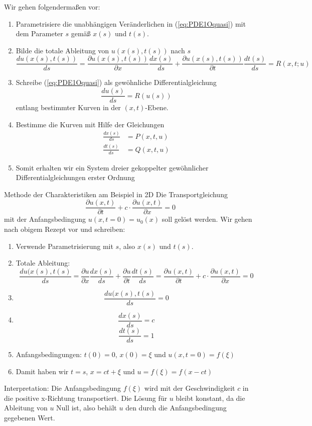 Wir gehen folgendermaßen vor:
\begin{enumerate}
    \item Parametrisiere die unabhängigen Veränderlichen in (\ref{eq:PDE1Oquasi}) mit dem Parameter $s$ gemäß $x(s)$ und $t(s)$.
    \item Bilde die totale Ableitung von $u(x(s),t(s))$ nach $s$
    \[
    \frac{du(x(s),t(s))}{ds}=
    \frac{\partial u(x(s),t(s))}{\partial x}\frac{dx(s)}{ds}+
    \frac{\partial u(x(s),t(s))}{\partial t}\frac{dt(s)}{ds}=
    R(x,t;u)
    \]
    \item Schreibe (\ref{eq:PDE1Oquasi}) als gewöhnliche Differentialgleichung
    \[\frac{du(s)}{ds}=R(u(s))\]
    entlang bestimmter Kurven in der $(x,t)$-Ebene.
    \item Bestimme die Kurven mit Hilfe der Gleichungen
    \begin{align*}
        \frac{dx(s)}{ds}&=P(x,t,u)\\
        \frac{dt(s)}{ds}&=Q(x,t,u)
    \end{align*}
    \item Somit erhalten wir ein System dreier gekoppelter gewöhnlicher Differentialgleichungen erster Ordnung
\end{enumerate}
%
\begin{example}{Methode der Charakteristiken am Beispiel in 2D}
Die Transportgleichung
\[
\frac{\partial u(x,t)}{\partial t}+c\cdot\frac{\partial u(x,t)}{\partial x}=0
\]
mit der Anfangsbedingung $u(x,t=0)=u_0(x)$ soll gelöst werden. Wir gehen nach obigem Rezept vor und schreiben:
\begin{enumerate}
    \item Verwende Parametrisierung mit $s$, also $x(s)$ und $t(s)$.
    \item Totale Ableitung:
    \[\frac{du(x(s),t(s)}{ds}=\frac{\partial u}{\partial x}\frac{dx(s)}{ds}+
    \frac{\partial u}{\partial t}\frac{dt(s)}{ds}=
    \frac{\partial u(x,t)}{\partial t}+c\cdot\frac{\partial u(x,t)}{\partial x}=0\]
    \item\[\frac{du(x(s),t(s)}{ds}=0\]
    \item \[\frac{dx(s)}{ds}=c\]
    \[\frac{dt(s)}{ds}=1\]
    \item Anfangsbedingungen: $t(0)=0$, $x(0)=\xi $ und $u(x,t=0)=f(\xi)$
    \item Damit haben wir $t=s$, $x=ct+\xi $ und $u=f(\xi)=f(x-ct)$
\end{enumerate}
Interpretation: Die Anfangsbedingung $f(\xi)$ wird mit der Geschwindigkeit $c$ in die positive x-Richtung transportiert. Die Lösung für $u$ bleibt konstant, da die Ableitung von $u$ Null ist, also behält  $u$ den durch die Anfangsbedingung gegebenen Wert.
\end{example}
